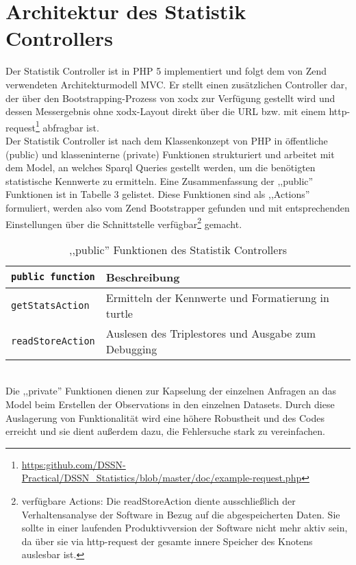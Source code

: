 \documentclass{article}
\begin{document}
\section{Architektur des Statistik Controllers}
Der Statistik Controller ist in PHP 5 implementiert und folgt dem von Zend verwendeten Architekturmodell MVC. Er stellt einen zusätzlichen Controller dar, der über den Bootstrapping-Prozess von xodx zur Verfügung gestellt wird und dessen Messergebnis ohne xodx-Layout direkt über die URL bzw. mit einem http-request\footnote{\url{https:github.com/DSSN-Practical/DSSN\_Statistics/blob/master/doc/example-request.php}} abfragbar ist.\\
Der Statistik Controller ist nach dem Klassenkonzept von PHP in öffentliche (public) und klasseninterne (private) Funktionen strukturiert und arbeitet mit dem Model, an welches Sparql Queries gestellt werden, um die benötigten statistische Kennwerte zu ermitteln. Eine Zusammenfassung der ,,public'' Funktionen ist in Tabelle 3 gelistet. Diese Funktionen sind als ,,Actions'' formuliert, werden also vom Zend Bootstrapper gefunden und mit entsprechenden Einstellungen über die Schnittstelle verfügbar\footnote{verfügbare Actions: Die readStoreAction diente ausschließlich der Verhaltensanalyse der Software in Bezug auf die abgespeicherten Daten. Sie sollte in einer laufenden Produktivversion der Software nicht mehr aktiv sein, da über sie via http-request der gesamte innere Speicher des Knotens auslesbar ist.} gemacht.\\
\begin{table}[h!]
\centering
\label{table3}
\begin{tabular}{|l|l|}
\hline
\texttt{public function} & Beschreibung \\ \hline
\texttt{getStatsAction}       & Ermitteln der Kennwerte und Formatierung in turtle 	\\ \hline
\texttt{readStoreAction}      & Auslesen des Triplestores und Ausgabe zum Debugging	\\ \hline
\end{tabular}
\caption{,,public'' Funktionen des Statistik Controllers}
\end{table}\\
Die ,,private'' Funktionen dienen zur Kapselung der einzelnen Anfragen an das Model beim Erstellen der Observations in den einzelnen Datasets. Durch diese Auslagerung von Funktionalität wird eine höhere Robustheit und des Codes erreicht und sie dient außerdem dazu, die Fehlersuche stark zu vereinfachen.
\end{document}
